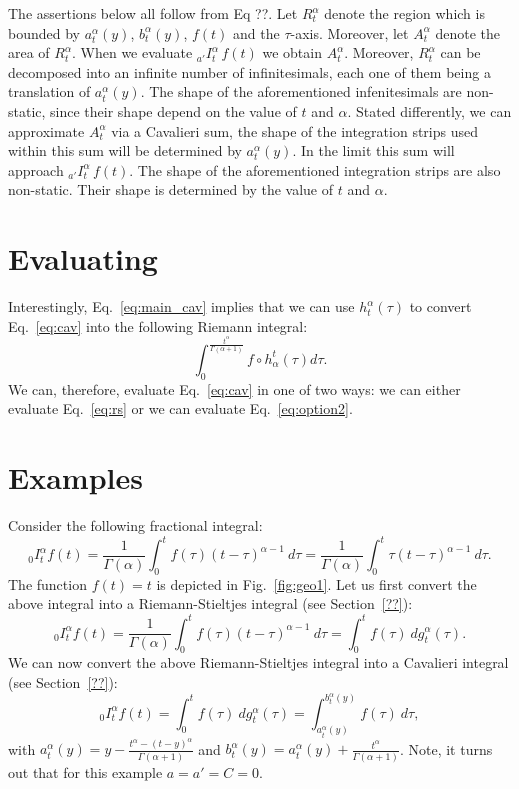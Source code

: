 \documentclass[twoside,reqno,11pt]{fcaa-var} %
\begin{document}
The assertions below all follow from Eq ??. Let $R_t^{\alpha}$ denote the region which is bounded by $a_t^{\alpha}(y)$, $b_t^{\alpha}(y)$, $f(t)$ and the $\tau$-axis. Moreover, let $A_{t}^{\alpha}$ denote the 
area of $R_t^{\alpha}$. When we evaluate $_{a'}I_t^{\alpha}\,f(t)$ we obtain $A_{t}^{\alpha}$. Moreover, $R_t^{\alpha}$ can be decomposed into an infinite number of infinitesimals, each one of them being a translation of $a_t^{\alpha}(y)$. The shape of the aforementioned infenitesimals are non-static, since their shape depend on the value of $t$ and $\alpha$. Stated differently, we can approximate $A_{t}^{\alpha}$ via a Cavalieri sum, the shape of the integration strips used within this sum will be determined by $a_t^{\alpha}(y)$. In the limit this sum will approach $_{a'}I_t^{\alpha}\,f(t)$. The shape of the aforementioned integration strips are also non-static. Their shape is determined by the value of $t$ and $\alpha$. 

\section{Evaluating}
\noindent
Interestingly, Eq.~\eqref{eq:main_cav} implies that we can use $h_t^{\alpha}(\tau)$ to convert Eq.~\eqref{eq:cav} into the following Riemann integral:
\begin{equation}
\label{eq:option2}
\int_0^{\frac{t^{\alpha}}{\Gamma(\alpha+1)}} f\circ h_{\alpha}^t (\tau) d\tau.  
\end{equation}
We can, therefore, evaluate Eq.~\eqref{eq:cav} in one of two ways: we can either evaluate Eq.~\eqref{eq:rs} or we can evaluate Eq.~\eqref{eq:option2}.



\section{Examples}
Consider the following fractional integral:
\begin{equation}
\label{eq:ex1_raw}
_0I_t^{\alpha} f(t) = \frac{1}{\Gamma(\alpha)}\int_0^t f(\tau) (t-\tau)^{\alpha-1}~d\tau = \frac{1}{\Gamma(\alpha)}\int_0^t \tau(t-\tau)^{\alpha-1}~d\tau. 
\end{equation}
The function $f(t) = t$ is depicted in Fig.~\ref{fig:geo1}. Let us first convert 
the above integral into a Riemann-Stieltjes integral (see Section~\ref{??}):
\begin{equation}
_0I_t^{\alpha} f(t)=\frac{1}{\Gamma(\alpha)}\int_0^t f(\tau) (t-\tau)^{\alpha-1}~d\tau = \int_0^t f(\tau)~dg_t^{\alpha}(\tau). 
\end{equation}
We can now convert the above Riemann-Stieltjes integral into a Cavalieri integral (see Section~\ref{??}):
\begin{equation}
\label{eq:ex1}
_0I_t^{\alpha} f(t) = \int_0^t f(\tau)~dg_t^{\alpha}(\tau)=\int_{a_t^{\alpha}(y)}^{b_t^{\alpha}(y)} f(\tau)~d\tau,
\end{equation}
with $a_t^{\alpha}(y) = y - \frac{t^{\alpha}-(t-y)^{\alpha}}{\Gamma(\alpha+1)}$ and $b_t^{\alpha}(y) = a_t^{\alpha}(y) + \frac{t^{\alpha}}{\Gamma(\alpha+1)}$. Note, it turns out that for this example $a=a'=C=0$. 
\end{document}
